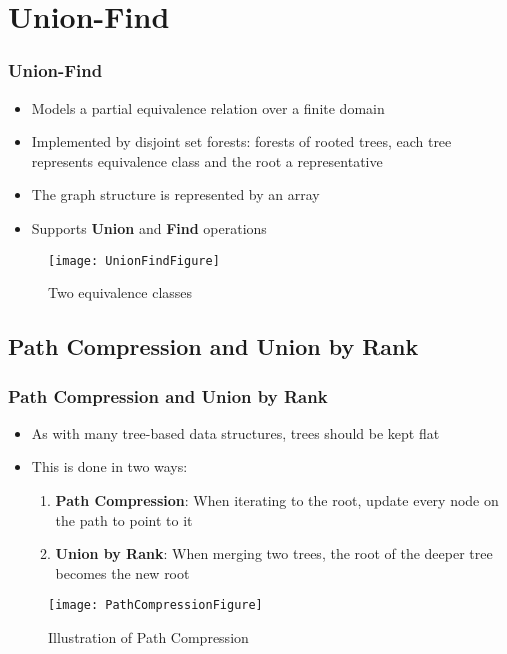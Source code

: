 \section{Union-Find}
\begin{frame}
\frametitle{Union-Find}
\begin{itemize}
	\item Models a partial equivalence relation
over a finite domain
	\item Implemented by disjoint set forests:
forests of rooted trees, each tree represents equivalence class and the root a representative
\item The graph structure is represented by an array
	\item Supports \textbf{Union} and \textbf{Find} operations
\end{itemize}
\vspace{-2cm}
\begin{figure}
	\centering
	\begin{minipage}{5cm}
		\caption{Two equivalence classes}\end{minipage}
	\begin{minipage}{8cm}\texttt{[image: UnionFindFigure]}\end{minipage}
\end{figure}
\end{frame}

\subsection{Path Compression and Union by Rank}
\begin{frame}
\frametitle{Path Compression and Union by Rank}
\begin{itemize}
	\item As with many tree-based data structures, trees should be kept flat
	\item This is done in two ways: 
	\begin{enumerate}
		\item \textbf{Path Compression}: When iterating to the root, update every node on the path to point to it
		\item \textbf{Union by Rank}: When merging two trees, the root of the deeper tree becomes the new root
	\end{enumerate}
\end{itemize}	
\begin{figure}
	\centering
	\begin{minipage}{5cm}
		\caption{Illustration of Path Compression}\end{minipage}
	\begin{minipage}{8cm}\texttt{[image: PathCompressionFigure]}\end{minipage}
\end{figure}
\end{frame}

